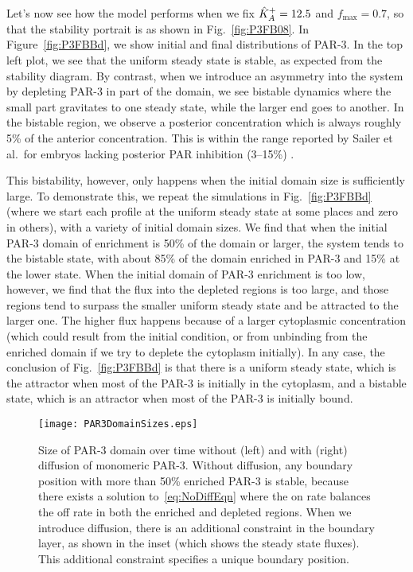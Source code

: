 \documentclass[11pt]{article}
\newcommand{\6}[1]{#1_{\text{6}}}
\newcommand{\3}[1]{#1_{\text{3}}}
\begin{document}
Let's now see how the model performs when we fix $\hat{K}^\text{+}_A=12.5$ and $f_\text{max}=0.7$, so that the stability portrait is as shown in Fig.\ \ref{fig:P3FB08}. In Figure\ \ref{fig:P3FBBd}, we show initial and final distributions of PAR-3. In the top left plot, we see that the uniform steady state is stable, as expected from the stability diagram. By contrast, when we introduce an asymmetry into the system by depleting PAR-3 in part of the domain, we see bistable dynamics where the small part gravitates to one steady state, while the larger end goes to another. In the bistable region, we observe a posterior concentration which is always roughly 5\% of the anterior concentration. This is within the range reported by Sailer et al.\ for embryos lacking posterior PAR inhibition (3--15\%) \cite[Fig.~4C]{sailer2015dynamic}.

This bistability, however, only happens when the initial domain size is sufficiently large. To demonstrate this, we repeat the simulations in Fig.\ \ref{fig:P3FBBd} (where we start each profile at the uniform steady state at some places and zero in others), with a variety of initial domain sizes. We find that when the initial PAR-3 domain of enrichment is 50\% of the domain or larger, the system tends to the bistable state, with about 85\% of the domain enriched in PAR-3 and 15\% at the lower state. When the initial domain of PAR-3 enrichment is too low, however, we find that the flux into the depleted regions is too large, and those regions tend to surpass the smaller uniform steady state and be attracted to the larger one. The higher flux happens because of a larger cytoplasmic concentration (which could result from the initial condition, or from unbinding from the enriched domain if we try to deplete the cytoplasm initially). In any case, the conclusion of Fig.\ \ref{fig:P3FBBd} is that there is a uniform steady state, which is the attractor when most of the PAR-3 is initially in the cytoplasm, and a bistable state, which is an attractor when most of the PAR-3 is initially bound. 

\begin{figure}
\centering
\texttt{[image: PAR3DomainSizes.eps]}
\caption{\label{fig:WWoDiff}Size of PAR-3 domain over time without (left) and with (right) diffusion of monomeric PAR-3. Without diffusion, any boundary position with more than 50\% enriched PAR-3 is stable, because there exists a solution to\ \eqref{eq:NoDiffEqn} where the on rate balances the off rate in both the enriched and depleted regions. When we introduce diffusion, there is an additional constraint in the boundary layer, as shown in the inset (which shows the steady state fluxes). This additional constraint specifies a unique boundary position.}
\end{figure}
\end{document}
